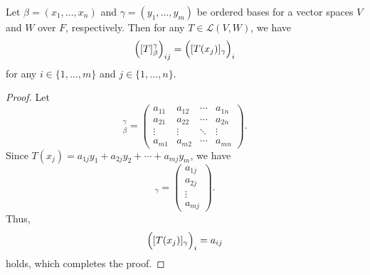 \begin{proposition}
  \label{prop:matrix-representation}
  Let $\beta = (x_1, \dots, x_n)$ and $\gamma = (y_1, \dots, y_m)$ be ordered
  bases for a vector spaces $V$ and $W$ over $F$, respectively.
  Then for any $T \in \mathcal{L}(V, W)$, we have
  \begin{equation*}
    \Bigl([T]_\beta^\gamma\Bigr)_{ij} = \Bigl([T(x_j)]_\gamma\Bigr)_i
  \end{equation*}
  for any $i \in \{1, \dots, m\}$ and $j \in \{1, \dots, n\}$.
\end{proposition}
\begin{proof}
  Let
  \begin{equation*}
    [T]_\beta^\gamma =
    \begin{pmatrix}
      a_{11} & a_{12} & \cdots & a_{1n} \\
      a_{21} & a_{22} & \cdots & a_{2n} \\
      \vdots & \vdots & \ddots & \vdots \\
      a_{m1} & a_{m2} & \cdots & a_{mn}
    \end{pmatrix}.
  \end{equation*}
  Since $T(x_j) = a_{1j}y_1 + a_{2j}y_2 + \cdots + a_{mj}y_m$, we have
  \begin{equation*}
    [T(x_j)]_\gamma
    = \begin{pmatrix} a_{1j} \\ a_{2j} \\ \vdots \\ a_{mj} \end{pmatrix}.
  \end{equation*}
  Thus,
  \begin{equation*}
    \Bigl([T(x_j)]_\gamma\Bigr)_i = a_{ij}
  \end{equation*}
  holds, which completes the proof.
\end{proof}

